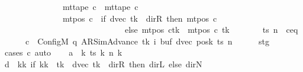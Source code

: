 \begin{isabellebody}
\ \ \ \ \ \ \ \ \ \ \ \ \ \ {\isasymand}\ mt{\isacharunderscore}{\kern0pt}tape\ c{\isacharprime}{\kern0pt}{\isacharprime}{\kern0pt}\ {\isacharequal}{\kern0pt}\ mt{\isacharunderscore}{\kern0pt}tape\ c{\isacharprime}{\kern0pt}\isanewline
\ \ \ \ \ \ \ \ \ \ \ \ \ \ {\isasymand}\ mt{\isacharunderscore}{\kern0pt}pos\ c{\isacharprime}{\kern0pt}{\isacharprime}{\kern0pt}\ {\isacharequal}{\kern0pt}\ {\isacharparenleft}{\kern0pt}if\ dvec\ tk\ {\isacharequal}{\kern0pt}\ dir{\isachardot}{\kern0pt}R\ then\ mt{\isacharunderscore}{\kern0pt}pos\ c{\isacharprime}{\kern0pt}\isanewline
\ \ \ \ \ \ \ \ \ \ \ \ \ \ \ \ \ \ \ \ \ \ \ \ \ \ \ \ \ \ else\ {\isacharparenleft}{\kern0pt}mt{\isacharunderscore}{\kern0pt}pos\ c{\isacharprime}{\kern0pt}{\isacharparenright}{\kern0pt}{\isacharparenleft}{\kern0pt}tk\ {\isacharcolon}{\kern0pt}{\isacharequal}{\kern0pt}\ mt{\isacharunderscore}{\kern0pt}pos\ c{\isacharprime}{\kern0pt}\ tk\ {\isacharminus}{\kern0pt}\ {}{\isacharparenright}{\kern0pt}{\isacharparenright}{\kern0pt}{\isachardoublequoteclose}\isanewline
%
\isadelimproof
%
\endisadelimproof
%
\isatagproof
{}\isamarkupfalse%
\ {\isacharminus}{\kern0pt}\isanewline
\ \ \isamarkupfalse%
\ ts\ n\ \ c{\isacharprime}{\kern0pt}{\isacharunderscore}{\kern0pt}eq{\isacharcolon}{\kern0pt}\isanewline
\ \ \ \ \ \ {\isachardoublequoteopen}c{\isacharprime}{\kern0pt}\ {\isacharequal}{\kern0pt}\ Config\isactrlsub M\ {\isacharparenleft}{\kern0pt}q{\isacharcomma}{\kern0pt}\ AR{\isacharunderscore}{\kern0pt}SimAdvance{\isacharcomma}{\kern0pt}\ tk{\isacharcomma}{\kern0pt}\ i{\isacharcomma}{\kern0pt}\ buf{\isacharcomma}{\kern0pt}\ dvec{\isacharcomma}{\kern0pt}\ posk{\isacharparenright}{\kern0pt}\ ts\ n{\isachardoublequoteclose}\isanewline
\ \ \ \ \isamarkupfalse%
\ stg\ \isamarkupfalse%
\ {\isacharparenleft}{\kern0pt}cases\ c{\isacharprime}{\kern0pt}{\isacharparenright}{\kern0pt}\ auto\isanewline
\ \ \isamarkupfalse%
\ {\isacharquery}{\kern0pt}a\ {\isacharequal}{\kern0pt}\ {\isachardoublequoteopen}{\isasymlambda}k{\isachardot}{\kern0pt}\ ts\ k\ {\isacharparenleft}{\kern0pt}n\ k{\isacharparenright}{\kern0pt}{\isachardoublequoteclose}\isanewline
\ \ \isamarkupfalse%
\ {\isacharquery}{\kern0pt}d\ {\isacharequal}{\kern0pt}\ {\isachardoublequoteopen}{\isasymlambda}kk{\isachardot}{\kern0pt}\ if\ kk\ {\isacharequal}{\kern0pt}\ tk\ {\isasymand}\ dvec\ tk\ {\isasymnoteq}\ dir{\isachardot}{\kern0pt}R\ then\ dir{\isachardot}{\kern0pt}L\ else\ dir{\isachardot}{\kern0pt}N{\isachardoublequoteclose}\isanewline

\end{isabellebody}

